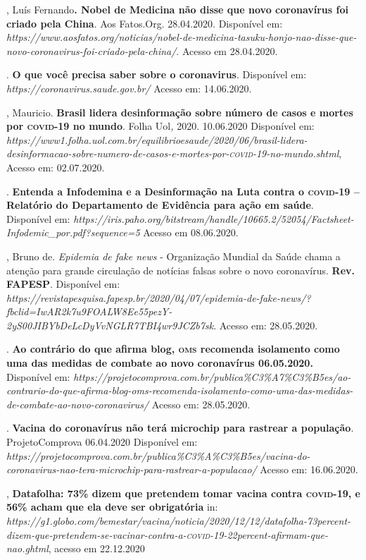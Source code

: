 \begin{bibliohedra}
, Luís Fernando\textbf{. Nobel de Medicina não disse que novo
coronavírus foi criado pela China}. Aos Fatos.Org. 28.04.2020.
Disponível em:
\textit{https://www.aosfatos.org/noticias/nobel-de-medicina-tasuku-honjo-nao-disse-que-novo-coronavirus-foi-criado-pela-china/}.
Acesso em 28.04.2020.

. \textbf{O que você precisa saber sobre o
coronavirus}. Disponível em:
\textit{https://coronavirus.saude.gov.br/}
Acesso em: 14.06.2020.

, Mauricio. \textbf{Brasil lidera desinformação sobre número de
casos e mortes por \textsc{covid-19} no mundo}. Folha Uol\textit{,} 2020.
10.06.2020 Disponível em:
\textit{https://www1.folha.uol.com.br/equilibrioesaude/2020/06/brasil-lidera-desinformacao-sobre-numero-de-casos-e-mortes-por-\textsc{covid-19}-no-mundo.shtml},
Acesso em: 02.07.2020.

. \textbf{Entenda a Infodemina e a Desinformação na Luta
contra o \textsc{covid-19} -- Relatório do Departamento de Evidência para ação em
saúde}. Disponível em:
\textit{https://iris.paho.org/bitstream/handle/10665.2/52054/Factsheet-Infodemic\_por.pdf?sequence=5}
Acesso em 08.06.2020.

, Bruno de.
\textit{Epidemia de fake news} - Organização Mundial da Saúde chama a
atenção para grande circulação de notícias falsas sobre o novo
coronavírus. \textbf{Rev. FAPESP}. Disponível em:
\textit{https://revistapesquisa.fapesp.br/2020/04/07/epidemia-de-fake-news/?fbclid=IwAR2k7u9FOALW8Ee55pezY-2yS00JIBYbDeLcDyVvNGLR7TBI4wr9JCZb7sk}.
Acesso em: 28.05.2020.

.
\textbf{Ao contrário do que afirma blog, \textsc{oms} recomenda isolamento como uma das
medidas de combate ao novo coronavírus 06.05.2020.} Disponível em:
\textit{https://projetocomprova.com.br/publica\%C3\%A7\%C3\%B5es/ao-contrario-do-que-afirma-blog-oms-recomenda-isolamento-como-uma-das-medidas-de-combate-ao-novo-coronavirus/}
Acesso em: 28.05.2020.

\titidem. \textbf{Vacina do coronavírus
não terá microchip para rastrear a população}. ProjetoComprova
06.04.2020 Disponível em:
\textit{https://projetocomprova.com.br/publica\%C3\%A\%C3\%B5es/vacina-do-coronavirus-nao-tera-microchip-para-rastrear-a-populacao/}
Acesso em: 16.06.2020.

, \textbf{Datafolha: 73\% dizem que pretendem tomar vacina contra
\textsc{covid-19}, e 56\% acham que ela deve ser obrigatória} in:
\textit{https://g1.globo.com/bemestar/vacina/noticia/2020/12/12/datafolha-73percent-dizem-que-pretendem-se-vacinar-contra-a-\textsc{covid-19}-22percent-afirmam-que-nao.ghtml},
acesso em 22.12.2020


\end{bibliohedra}
